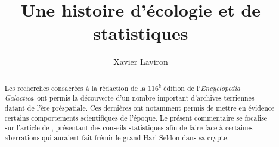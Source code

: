%



\newcommand{\EG}{\textit{Encyclopedia Galactica}}

\title{Une histoire d'écologie et de statistiques}

\author[1,*]{Xavier Laviron}



\ociscodes{}


\begin{abstract}
  Les recherches consacrées à la rédaction de la 116\textsuperscript{è} édition
  de l'\EG~ont permis la découverte d'un nombre important d'archives terriennes
  datant de l'ère préspatiale.
  Ces dernières ont notamment permis de mettre en évidence certains
  comportements scientifiques de l'époque.
  Le présent commentaire se focalise sur l'article de \citet{garamszegi2016},
  présentant des conseils statistiques afin de faire face à certaines
  aberrations qui auraient fait frémir le grand Hari Seldon dans sa crypte.
\end{abstract}




